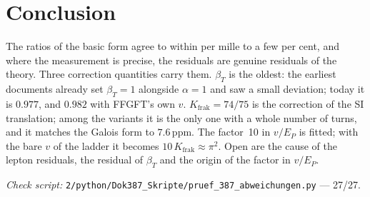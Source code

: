 \section{Conclusion}

The ratios of the basic form agree to within per mille to a few per cent, and where the measurement
is precise, the residuals are genuine residuals of the theory. Three correction quantities carry
them. $\beta_T$ is the oldest: the earliest documents already set $\beta_T=1$ alongside $\alpha=1$
and saw a small deviation; today it is $0.977$, and $0.982$ with FFGFT's own $v$.
$K_{\text{frak}}=74/75$ is the correction of the SI translation; among the variants it is the only
one with a whole number of turns, and it matches the Galois form to $7.6$\,ppm. The factor~10 in
$v/E_P$ is fitted; with the bare $v$ of the ladder it becomes $10\,K_{\text{frak}}\approx\pi^2$.
Open are the cause of the lepton residuals, the residual of $\beta_T$ and the origin of the factor
in $v/E_P$.

\vspace{1em}
\noindent\textit{Check script:} \texttt{2/python/Dok387\_Skripte/pruef\_387\_abweichungen.py}
--- 27/27.
